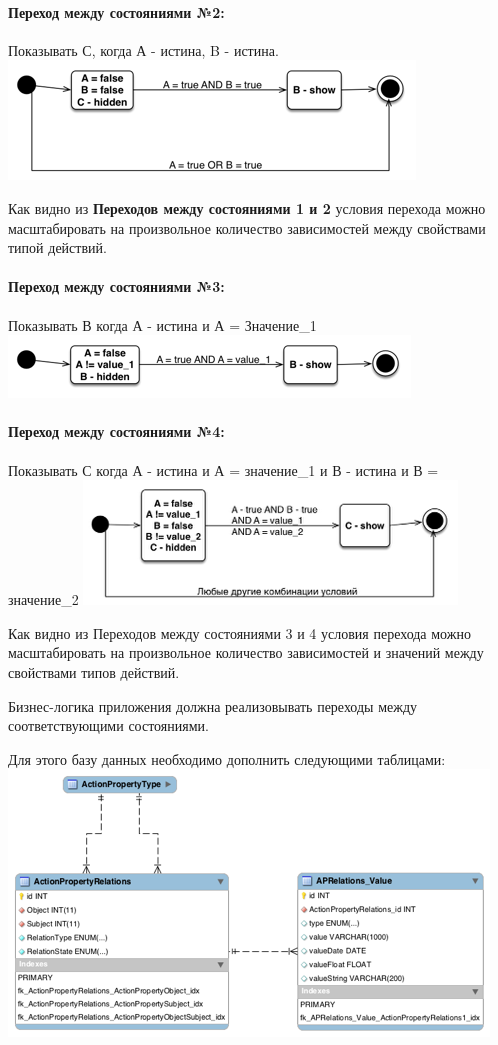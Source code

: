 \documentclass[a4paper,8pt]{report} %
\begin{document}
{    \paragraph*{Переход между состояниями №2:} Показывать С, когда А - истина, B - истина.
    \includegraphics{condition_2}

    Как видно из \textbf{Переходов между состояниями 1 и 2} условия перехода можно
    масштабировать на произвольное количество зависимостей между свойствами типой
    действий.

    \paragraph*{Переход между состояниями №3:} Показывать В когда А - истина и А = Значение\_1
    \includegraphics{condition_3}

    \paragraph*{Переход между состояниями №4:} Показывать С когда А - истина и А = значение\_1 и В - истина и В = значение\_2
    \includegraphics{condition_4}

    Как видно из Переходов между состояниями 3 и 4 условия перехода можно
    масштабировать на произвольное количество зависимостей и значений между свойствами
    типов действий.

    Бизнес-логика приложения должна реализовывать переходы между соответствующими
    состояниями.

    Для этого базу данных необходимо дополнить следующими таблицами:
    \includegraphics{table_structures}

}
\end{document}
